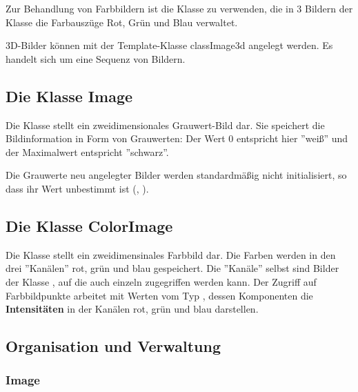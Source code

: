 Zur Behandlung von Farbbildern ist die Klasse 
zu verwenden, die in 3 Bildern der Klasse  die Farbauszüge 
Rot, Grün und Blau verwaltet.

3D-Bilder können mit der Template-Klasse class{Image3d} angelegt werden.
Es handelt sich um eine Sequenz von Bildern.

\subsection{Die Klasse Image}
\label{Image}
\hypertarget{Image}{}

Die Klasse  stellt ein zweidimensionales Grauwert-Bild dar. 
Sie speichert die Bildinformation in Form von Grauwerten: Der 
Wert 0 entspricht hier ''weiß'' und der Maximalwert 
entspricht ''schwarz''.

Die Grauwerte neu angelegter Bilder werden standardmäßig 
nicht initialisiert, so dass ihr Wert unbestimmt ist (, ).

\subsection{Die Klasse ColorImage}
\label{ColorImage}
\hypertarget{ColorImage}{}

Die Klasse  stellt ein zweidimensinales Farbbild dar. Die Farben
werden in den drei ''Kanälen'' rot, grün und blau gespeichert. Die ''Kanäle'' selbst 
sind Bilder der Klasse , auf die auch einzeln zugegriffen werden kann.
Der Zugriff auf Farbbildpunkte arbeitet mit Werten vom Typ , dessen
Komponenten die {\bf Intensitäten} in der Kanälen rot, grün und blau darstellen.

\subsection{Organisation und Verwaltung}
\subsubsection{Image}



